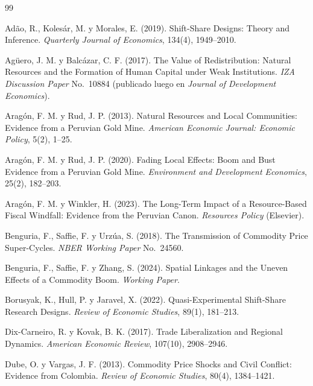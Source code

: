\documentclass[11pt]{article}
\begin{document}
\begin{thebibliography}{99}
\setlength{\itemsep}{2pt}

Adão, R., Kolesár, M. y Morales, E. (2019). Shift-Share Designs: Theory and Inference.
\textit{Quarterly Journal of Economics}, 134(4), 1949--2010.

Agüero, J. M. y Balcázar, C. F. (2017). The Value of Redistribution: Natural Resources and the
Formation of Human Capital under Weak Institutions. \textit{IZA Discussion Paper} No.\ 10884
(publicado luego en \textit{Journal of Development Economics}).

Aragón, F. M. y Rud, J. P. (2013). Natural Resources and Local Communities: Evidence from a
Peruvian Gold Mine. \textit{American Economic Journal: Economic Policy}, 5(2), 1--25.

Aragón, F. M. y Rud, J. P. (2020). Fading Local Effects: Boom and Bust Evidence from a
Peruvian Gold Mine. \textit{Environment and Development Economics}, 25(2), 182--203.

Aragón, F. M. y Winkler, H. (2023). The Long-Term Impact of a Resource-Based Fiscal Windfall:
Evidence from the Peruvian Canon. \textit{Resources Policy} (Elsevier).

Benguria, F., Saffie, F. y Urzúa, S. (2018). The Transmission of Commodity Price Super-Cycles.
\textit{NBER Working Paper} No.\ 24560.

Benguria, F., Saffie, F. y Zhang, S. (2024). Spatial Linkages and the Uneven Effects of a
Commodity Boom. \textit{Working Paper}.

Borusyak, K., Hull, P. y Jaravel, X. (2022). Quasi-Experimental Shift-Share Research Designs.
\textit{Review of Economic Studies}, 89(1), 181--213.

Dix-Carneiro, R. y Kovak, B. K. (2017). Trade Liberalization and Regional Dynamics.
\textit{American Economic Review}, 107(10), 2908--2946.

Dube, O. y Vargas, J. F. (2013). Commodity Price Shocks and Civil Conflict: Evidence from
Colombia. \textit{Review of Economic Studies}, 80(4), 1384--1421.


\end{thebibliography}
\end{document}
